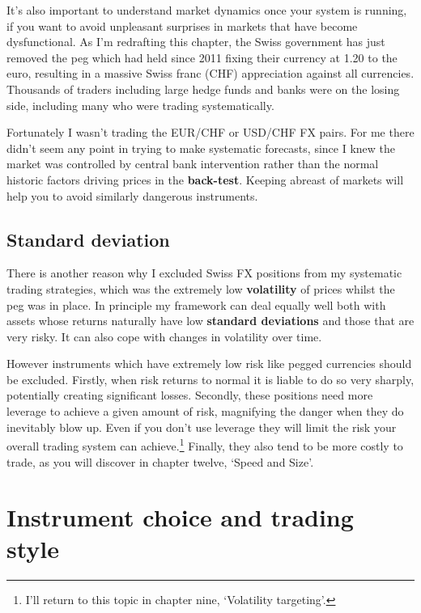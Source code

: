 It's also important to understand market dynamics once your system is running, if you want to avoid unpleasant surprises in markets that have become dysfunctional. As I'm redrafting this chapter, the Swiss government has just removed the peg which had held since 2011 fixing their currency at 1.20 to the euro, resulting in a massive Swiss franc (CHF) appreciation against all currencies. Thousands of traders including large hedge funds and banks were on the losing side, including many who were trading systematically. 

Fortunately I wasn't trading the EUR/CHF or USD/CHF FX pairs. For me there didn't seem any point in trying to make systematic forecasts, since I knew the market was controlled by central bank intervention rather than the normal historic factors driving prices in the \textbf{back-test}. Keeping abreast of markets will help you to avoid similarly dangerous instruments.

\subsection*{Standard deviation}

There is another reason why I excluded Swiss FX positions from my systematic trading strategies, which was the extremely low \textbf{volatility} of prices whilst the peg was in place. In principle my framework can deal equally well both with assets whose returns naturally have low \textbf{standard deviations} and those that are very risky. It can also cope with changes in volatility over time.

However instruments which have extremely low risk like pegged currencies should be excluded. Firstly, when risk returns to normal it is liable to do so very sharply, potentially creating significant losses. Secondly, these positions need more leverage to achieve a given amount of risk, magnifying the danger when they do inevitably blow up. Even if you don't use leverage they will limit the risk your overall trading system can achieve.\footnote{I'll return to this topic in chapter nine, ‘Volatility targeting'.} Finally, they also tend to be more costly to trade, as you will discover in chapter twelve, ‘Speed and Size'.

\section*{Instrument choice and trading style}  {}

